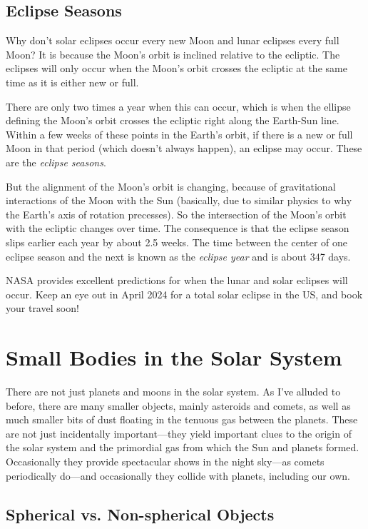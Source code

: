 \documentclass[12pt, preprint]{aastex}
\begin{document}
\subsection{Eclipse Seasons}

Why don't solar eclipses occur every new Moon and lunar eclipses every
full Moon? It is because the Moon's orbit is inclined relative to the
ecliptic. The eclipses will only occur when the Moon's orbit crosses
the ecliptic at the same time as it is either new or full. 

There are only two times a year when this can occur, which is when the
ellipse defining the Moon's orbit crosses the ecliptic right along the
Earth-Sun line. Within a few weeks of these points in the Earth's
orbit, if there is a new or full Moon in that period (which doesn't
always happen), an eclipse may occur. These are the {\it eclipse
  seasons}.

But the alignment of the Moon's orbit is changing, because of
gravitational interactions of the Moon with the Sun (basically, due to
similar physics to why the Earth's axis of rotation precesses). So the
intersection of the Moon's orbit with the ecliptic changes over
time. The consequence is that the eclipse season slips earlier each
year by about 2.5 weeks. The time between the center of one eclipse
season and the next is known as the {\it eclipse year} and is about
347 days.

NASA provides excellent predictions for when the lunar and solar
eclipses will occur. Keep an eye out in April 2024 for a total solar
eclipse in the US, and book your travel soon! 

\section{Small Bodies in the Solar System}

There are not just planets and moons in the solar system. As I've
alluded to before, there are many smaller objects, mainly asteroids
and comets, as well as much smaller bits of dust floating in the
tenuous gas between the planets. These are not just incidentally
important---they yield important clues to the origin of the solar
system and the primordial gas from which the Sun and planets
formed. Occasionally they provide spectacular shows in the night
sky---as comets periodically do---and occasionally they collide with
planets, including our own.

\subsection{Spherical vs. Non-spherical Objects}
\end{document}
